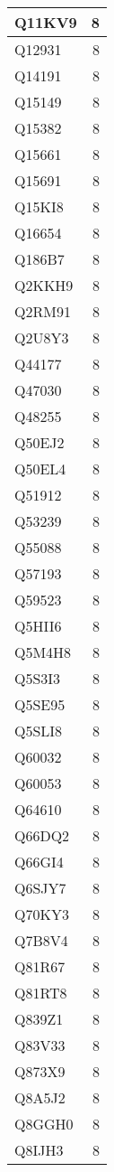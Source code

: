 \documentclass[
]{book}
\theoremstyle{definition}
\theoremstyle{definition}
\theoremstyle{definition}
\theoremstyle{definition}
\theoremstyle{remark}
\begin{document}
\begin{table}
\begin{tabular}{l|r}
\hline
Q11KV9 & 8\\
\hline
Q12931 & 8\\
\hline
Q14191 & 8\\
\hline
Q15149 & 8\\
\hline
Q15382 & 8\\
\hline
Q15661 & 8\\
\hline
Q15691 & 8\\
\hline
Q15KI8 & 8\\
\hline
Q16654 & 8\\
\hline
Q186B7 & 8\\
\hline
Q2KKH9 & 8\\
\hline
Q2RM91 & 8\\
\hline
Q2U8Y3 & 8\\
\hline
Q44177 & 8\\
\hline
Q47030 & 8\\
\hline
Q48255 & 8\\
\hline
Q50EJ2 & 8\\
\hline
Q50EL4 & 8\\
\hline
Q51912 & 8\\
\hline
Q53239 & 8\\
\hline
Q55088 & 8\\
\hline
Q57193 & 8\\
\hline
Q59523 & 8\\
\hline
Q5HII6 & 8\\
\hline
Q5M4H8 & 8\\
\hline
Q5S3I3 & 8\\
\hline
Q5SE95 & 8\\
\hline
Q5SLI8 & 8\\
\hline
Q60032 & 8\\
\hline
Q60053 & 8\\
\hline
Q64610 & 8\\
\hline
Q66DQ2 & 8\\
\hline
Q66GI4 & 8\\
\hline
Q6SJY7 & 8\\
\hline
Q70KY3 & 8\\
\hline
Q7B8V4 & 8\\
\hline
Q81R67 & 8\\
\hline
Q81RT8 & 8\\
\hline
Q839Z1 & 8\\
\hline
Q83V33 & 8\\
\hline
Q873X9 & 8\\
\hline
Q8A5J2 & 8\\
\hline
Q8GGH0 & 8\\
\hline
Q8IJH3 & 8\\

\end{tabular}
\end{table}
\end{document}
